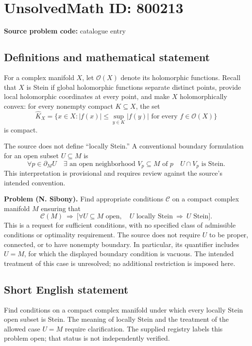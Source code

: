 \documentclass[11pt]{article}
\begin{document}
\section*{UnsolvedMath ID: 800213}
\textbf{Source problem code:} catalogue entry
\subsection{Definitions and mathematical statement}
For a complex manifold \(X\), let \(\mathcal O(X)\) denote its holomorphic functions. Recall that \(X\) is Stein if global holomorphic functions separate distinct points, provide local holomorphic coordinates at every point, and make \(X\) holomorphically convex: for every nonempty compact \(K\subseteq X\), the set
\[
\widehat K_X=\{x\in X: |f(x)|\leq \sup_{y\in K}|f(y)|\text{ for every }f\in\mathcal O(X)\}
\]
is compact.

The source does not define ``locally Stein.'' A conventional boundary formulation for an open subset \(U\subseteq M\) is
\[
\forall p\in\partial_M U\quad \exists\text{ an open neighborhood }V_p\subseteq M\text{ of }p
\quad U\cap V_p\text{ is Stein}.
\]
This interpretation is provisional and requires review against the source's intended convention.

\textbf{Problem (N. Sibony).} Find appropriate conditions \(\mathcal C\) on a compact complex manifold \(M\) ensuring that
\[
\mathcal C(M)\ \Longrightarrow\
\bigl[\forall U\subseteq M\text{ open},\quad
U\text{ locally Stein}\ \Longrightarrow\ U\text{ Stein}\bigr].
\]
This is a request for sufficient conditions, with no specified class of admissible conditions or optimality requirement. The source does not require \(U\) to be proper, connected, or to have nonempty boundary. In particular, its quantifier includes \(U=M\), for which the displayed boundary condition is vacuous. The intended treatment of this case is unresolved; no additional restriction is imposed here.
\subsection{Short English statement}
Find conditions on a compact complex manifold under which every locally Stein open subset is Stein. The meaning of locally Stein and the treatment of the allowed case \(U=M\) require clarification. The supplied registry labels this problem open; that status is not independently verified.
\end{document}
